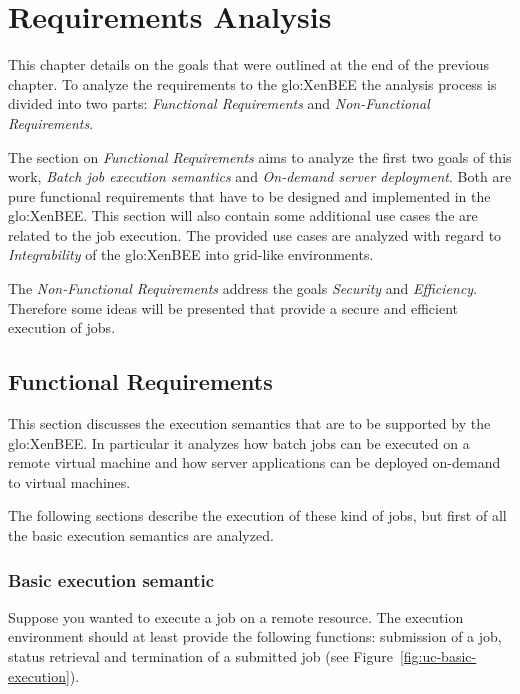 
\chapter{Requirements Analysis}
\label{cha:requirements}

This chapter  details on the  goals that were  outlined at the end  of the
previous chapter. To analyze  the requirements to the \gls{glo:XenBEE} the
analysis process is divided into two parts: \emph{Functional Requirements}
and \emph{Non-Functional Requirements}.

The section  on \emph{Functional Requirements}  aims to analyze  the first
two  goals of  this work,  \ie  \emph{Batch job  execution semantics}  and
\emph{On-demand server deployment}.  Both are pure functional requirements
that have  to be  designed and implemented  in the  \gls{glo:XenBEE}. This
section will also contain some additional use cases the are related to the
job  execution.   The provided  use  cases  are  analyzed with  regard  to
\emph{Integrability} of the \gls{glo:XenBEE} into grid-like environments.

The \emph{Non-Functional  Requirements} address the  goals \emph{Security}
and \emph{Efficiency}. Therefore some ideas will be presented that provide
a secure and efficient execution of jobs.

\section{Functional Requirements}
\label{sec:req:functional-requirements}

This section discusses the execution semantics that are to be supported by
the \gls{glo:XenBEE}.   In particular  it analyzes how  batch jobs  can be
executed on  a remote virtual machine  and how server  applications can be
deployed on-demand to virtual machines.

The following sections  describe the execution of these  kind of jobs, but
first of all the basic execution semantics are analyzed.

\subsection{Basic execution semantic}

Suppose you  wanted to execute a  job on a remote  resource. The execution
environment should at least provide the following functions: submission of
a  job,  status  retrieval  and   termination  of  a  submitted  job  (see
Figure~\ref{fig:uc-basic-execution}).

